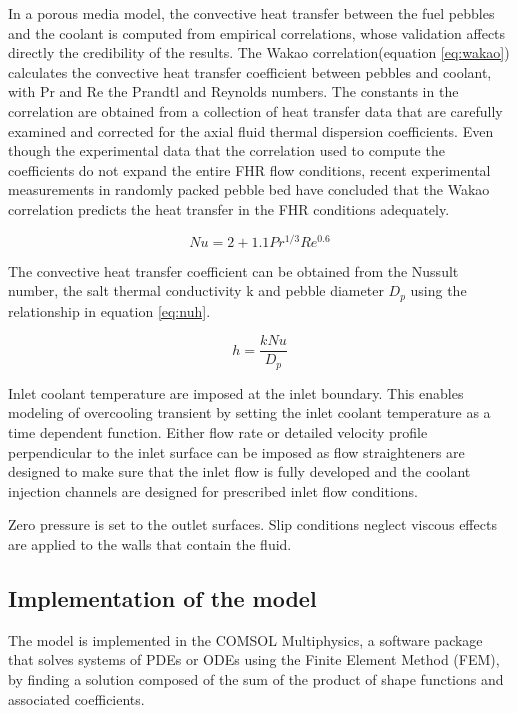 \documentclass{elsarticle}
\begin{document}
In a porous media model, the convective heat transfer between the fuel pebbles and the coolant is computed from empirical correlations, whose validation affects directly the credibility of the results. The Wakao correlation(equation \ref{eq:wakao})\cite{Wakao1979} calculates the convective heat transfer coefficient between pebbles and coolant, with Pr and Re the Prandtl and Reynolds numbers.
The constants in the correlation are obtained from a collection of heat transfer data that are carefully examined and corrected for the axial fluid thermal dispersion coefficients. Even though the experimental data that the correlation used to compute the coefficients do not expand the entire FHR flow conditions, recent experimental measurements in randomly packed pebble bed\cite{Huddar2016} have concluded that the Wakao correlation predicts the heat transfer in the FHR conditions adequately.

\begin{equation}
  Nu = 2 + 1.1 Pr^{1/3}Re^{0.6} 
  \label{eq:wakao}
\end{equation}

The convective heat transfer coefficient can be obtained from the Nussult number, the salt thermal conductivity k and pebble diameter $D_p$ using the relationship in equation \ref{eq:nuh}.

\begin{equation}
  h = \frac{kNu}{D_p}
  \label{eq:nuh}
\end{equation}


Inlet coolant temperature are imposed at the inlet boundary.  This enables modeling of overcooling transient by setting the inlet coolant temperature as a time dependent function. Either flow rate or detailed velocity profile perpendicular to the inlet surface can be imposed as flow straighteners are designed to make sure that the inlet flow is fully developed and the coolant injection channels are designed for prescribed inlet flow conditions.

Zero pressure is set to the outlet surfaces. Slip conditions neglect viscous effects are applied to the walls that contain the fluid.  



\subsection{Implementation of the model}
\label{sec:implementation}

The model is implemented in the COMSOL Multiphysics, a software package that solves systems of PDEs or ODEs using the Finite Element Method (FEM), by finding a solution composed of the sum of the product of shape functions and associated coefficients. 
 
\end{document}

